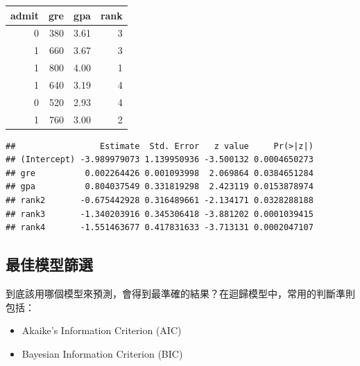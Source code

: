 \documentclass[]{book}
\newenvironment{Shaded}{\begin{snugshade}}{\end{snugshade}}
\newcommand{\DataTypeTok}[1]{\textcolor[rgb]{0.13,0.29,0.53}{#1}}
\newcommand{\KeywordTok}[1]{\textcolor[rgb]{0.13,0.29,0.53}{\textbf{#1}}}
\newcommand{\NormalTok}[1]{#1}
\newcommand{\OperatorTok}[1]{\textcolor[rgb]{0.81,0.36,0.00}{\textbf{#1}}}
\newcommand{\StringTok}[1]{\textcolor[rgb]{0.31,0.60,0.02}{#1}}
\providecommand{\tightlist}{%
  \setlength{\itemsep}{0pt}\setlength{\parskip}{0pt}}
\begin{document}
\begin{tabular}{r|r|r|r}
\hline
admit & gre & gpa & rank\\
\hline
0 & 380 & 3.61 & 3\\
\hline
1 & 660 & 3.67 & 3\\
\hline
1 & 800 & 4.00 & 1\\
\hline
1 & 640 & 3.19 & 4\\
\hline
0 & 520 & 2.93 & 4\\
\hline
1 & 760 & 3.00 & 2\\
\hline
\end{tabular}

\begin{Shaded}
\end{Shaded}

\begin{verbatim}
##                 Estimate  Std. Error   z value     Pr(>|z|)
## (Intercept) -3.989979073 1.139950936 -3.500132 0.0004650273
## gre          0.002264426 0.001093998  2.069864 0.0384651284
## gpa          0.804037549 0.331819298  2.423119 0.0153878974
## rank2       -0.675442928 0.316489661 -2.134171 0.0328288188
## rank3       -1.340203916 0.345306418 -3.881202 0.0001039415
## rank4       -1.551463677 0.417831633 -3.713131 0.0002047107
\end{verbatim}

\hypertarget{ux6700ux4f73ux6a21ux578bux7be9ux9078}{%
\subsection{最佳模型篩選}\label{ux6700ux4f73ux6a21ux578bux7be9ux9078}}

到底該用哪個模型來預測，會得到最準確的結果？在迴歸模型中，常用的判斷準則包括：

\begin{itemize}
\tightlist
\item
  Akaike's Information Criterion (AIC)
\item
  Bayesian Information Criterion (BIC)
\end{itemize}
\end{document}
